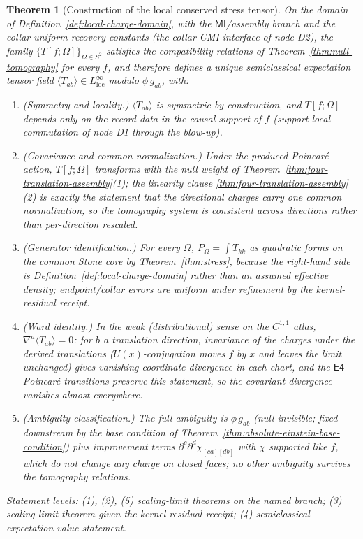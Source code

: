 \documentclass[11pt]{article}
\newtheorem{theorem}{Theorem}[section]
\begin{document}
\begin{theorem}[Construction of the local conserved stress tensor]
\label{thm:local-stress-construction}
On the domain of Definition~\ref{def:local-charge-domain}, with the
\(\mathsf{MI}\)/assembly branch and the collar-uniform recovery constants
(the collar CMI interface of node D2), the family
\(\{T[f;\Omega]\}_{\Omega\in S^2}\) satisfies the compatibility relations of
Theorem~\ref{thm:null-tomography} for every \(f\), and therefore defines a
unique semiclassical expectation tensor field
\(\langle T_{ab}\rangle\in L^\infty_{\mathrm{loc}}\) modulo
\(\phi\,g_{ab}\), with:
\begin{enumerate}[leftmargin=2em]
\item (\emph{Symmetry and locality.}) \(\langle T_{ab}\rangle\) is symmetric
by construction, and \(T[f;\Omega]\) depends only on the record data in the
causal support of \(f\) (support-local commutation of node D1 through the
blow-up).
\item (\emph{Covariance and common normalization.}) Under the produced
Poincar\'e action, \(T[f;\Omega]\) transforms with the null weight of
Theorem~\ref{thm:four-translation-assembly}(1); the linearity clause
\ref{thm:four-translation-assembly}(2) is exactly the statement that the
directional charges carry one common normalization, so the tomography system
is consistent across directions rather than per-direction rescaled.
\item (\emph{Generator identification.}) For every \(\Omega\),
\(P_\Omega=\int T_{kk}\) as quadratic forms on the common Stone core by
Theorem~\ref{thm:stress},
because the right-hand side is Definition~\ref{def:local-charge-domain}
rather than an assumed effective density; endpoint/collar errors are uniform
under refinement by the kernel-residual receipt.
\item (\emph{Ward identity.}) In the weak (distributional) sense on the
\(C^{1,1}\) atlas,
\(\nabla^a\langle T_{ab}\rangle=0\): for \(b\) a translation direction,
invariance of the charges under the derived translations
(\(U(x)\)-conjugation moves \(f\) by \(x\) and leaves the limit unchanged)
gives vanishing coordinate divergence in each chart, and the
\(\mathsf{E4}\) Poincar\'e transitions preserve this statement, so the
covariant divergence vanishes almost everywhere.
\item (\emph{Ambiguity classification.}) The full ambiguity is
\(\phi\,g_{ab}\) (null-invisible; fixed downstream by the base condition of
Theorem~\ref{thm:absolute-einstein-base-condition}) plus improvement terms
\(\partial^c\partial^d\chi_{[ca][db]}\) with \(\chi\) supported like \(f\),
which do not change any charge on closed faces; no other ambiguity survives
the tomography relations.
\end{enumerate}
Statement levels: (1), (2), (5) scaling-limit theorems on the named branch;
(3) scaling-limit theorem given the kernel-residual receipt; (4)
semiclassical expectation-value statement.
\end{theorem}
\end{document}
